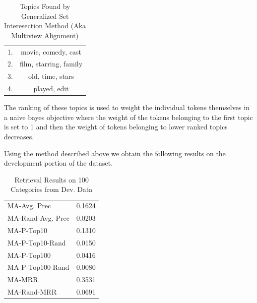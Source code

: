 \documentclass{article}
\begin{document}
\begin{table}[htbp]
  \centering
  \begin{tabular}{l c}\toprule
    1. & movie, comedy, cast\\
    2. & film, starring, family\\
    3. & old, time, stars\\
    4. & played, edit\\
    \bottomrule\end{tabular}
  \caption{Topics Found by Generalized Set Interesection Method (Aka Multiview Alignment)}
  \label{tab:topics}
\end{table}
The ranking of these topics is used to weight the individual tokens themselves
in a naive bayes objective where the weight of the tokens belonging to the first
topic is set to 1 and then the weight of tokens belonging to lower ranked topics
decreases.

Using the method described above we obtain the following results on the
development portion of the dataset.


\begin{table}[htbp]
  \centering
  \begin{tabular}{l c}\toprule
    MA-Avg. Prec     & 0.1624\\
MA-Rand-Avg. Prec& 0.0203\\
MA-P-Top10       & 0.1310\\
MA-P-Top10-Rand  & 0.0150\\
MA-P-Top100      & 0.0416\\
MA-P-Top100-Rand & 0.0080\\
MA-MRR           & 0.3531\\
MA-Rand-MRR      & 0.0691\\
    \bottomrule\end{tabular}
  \caption{Retrieval Results on 100 Categories from Dev. Data}
  \label{tab:summary-multiview-alignment}
\end{table}


\clearpage


\end{document}

